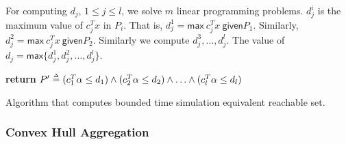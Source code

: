 For computing $d_j$, $1 \leq j \leq l$, we solve $m$ linear programming problems. $d_j^i$ is the maximum value of $c_j^T x$ in $P_i$. That is, $d_j^1 = \mathsf{max}~ c_j^T x~ \mathsf{given} P_1$. Similarly, $d_j^2 = \mathsf{max}~ c_j^T x~ \mathsf{given} P_2$. Similarly we compute $d_j^3, \ldots, d_j^l$. The value of $d_j = \mathsf{max} \{d_j^1, d_j^2, \ldots, d_j^l\}$.

\begin{algorithm}[h!]

{\bf return} $P' \mathrel{\stackrel{\scriptscriptstyle\Delta}{=}} (c_1^T \alpha \leq d_1) \wedge (c_2^T \alpha \leq d_2) \wedge \ldots \wedge (c_l^{T} \alpha \leq d_l)$\;
\caption{Algorithm that computes bounded time simulation equivalent reachable set.}
\label{alg:algoHybrid}
\end{algorithm}



\subsubsection{Convex Hull Aggregation}
